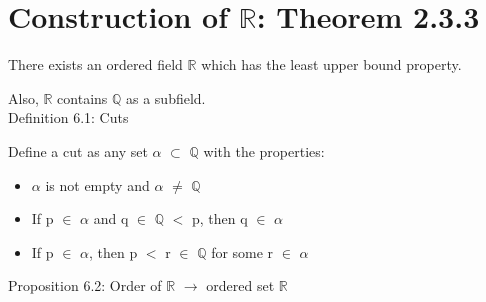 \newpage
\section[Day 6: Existence of $\mathbb{R}$]
{Construction of $\mathbb{R}$: {\normalsize \color{red} Theorem 2.3.3}}

	\begin{adjustbox}{minipage=14cm, right, vspace=0.1cm 0cm}
		There exists an ordered field $\mathbb{R}$ which has the
		least upper bound property.

		Also, $\mathbb{R}$ contains $\mathbb{Q}$ as a subfield. \\
	\end{adjustbox}
	
{ \color{blue} Definition 6.1: Cuts }

	\begin{adjustbox}{minipage=14cm, right, vspace=0.1cm 0cm}
		Define a cut as any set $\alpha$ $\subset$ $\mathbb{Q}$ with the properties:
	\end{adjustbox}

	\begin{itemize}[leftmargin=1cm, itemsep=0.4em]
		\item $\alpha$ is not empty and $\alpha$ $\not =$ $\mathbb{Q}$
		
		\item If p $\in$ $\alpha$ and q $\in$ $\mathbb{Q}$ $<$ p,
			then q $\in$ $\alpha$
		
			\item If p $\in$ $\alpha$, then p $<$ r $\in$ $\mathbb{Q}$ for
			some r $\in$ $\alpha$ \\
	\end{itemize}

{ \color{blue} Proposition 6.2: Order of $\mathbb{R}$ $\rightarrow$ ordered set $\mathbb{R}$ }

